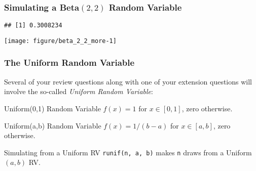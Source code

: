 \begin{frame}[fragile]
  \frametitle{Simulating a Beta$(2, 2)$ Random Variable}
\begin{knitrout}
\color{fgcolor}\begin{kframe}
\begin{alltt}
\hlopt{^}\hlstd{)}
\end{alltt}
\begin{verbatim}
## [1] 0.3008234
\end{verbatim}
\begin{alltt}
  \hlstd{=} \hlstd{)}
\end{alltt}
\end{kframe}
\texttt{[image: figure/beta\_2\_2\_more-1]} 

\end{knitrout}
\end{frame}
\begin{frame}
  \frametitle{The Uniform Random Variable}
Several of your review questions along with one of your extension questions will involve the so-called \emph{\alert{Uniform Random Variable}}:

\begin{block}{Uniform(0,1) Random Variable}
  $f(x) = 1$ for $x \in [0,1]$, zero otherwise.
\end{block}

\begin{block}{Uniform(a,b) Random Variable}
  $f(x) = 1/(b-a)$ for $x \in [a,b]$, zero otherwise.
\end{block}

\begin{alertblock}{Simulating from a Uniform RV}
  \texttt{runif(n, a, b)} makes \texttt{n} draws from a Uniform$(a,b)$ RV.
\end{alertblock}

\end{frame}
